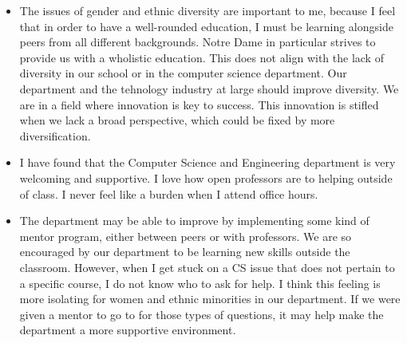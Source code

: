\documentclass[letterpaper]{article}
\begin{document}
\begin{itemize}
\item The issues of gender and ethnic diversity are important to me, because I feel that in order to have a well-rounded education, I must be learning alongside peers from all different backgrounds. Notre Dame in particular strives to provide us with a wholistic education. This does not align with the lack of diversity in our school or in the computer science department. Our department and the tehnology industry at large should improve diversity. We are in a field where innovation is key to success. This innovation is stifled when we lack a broad perspective, which could be fixed by more diversification.
\item I have found that the Computer Science and Engineering department is very welcoming and supportive. I love how open professors are to helping outside of class. I never feel like a burden when I attend office hours.
\item The department may be able to improve by implementing some kind of mentor program, either between peers or with professors. We are so encouraged by our department to be learning new skills outside the classroom. However, when I get stuck on a CS issue that does not pertain to a specific course, I do not know who to ask for help. I think this feeling is more isolating for women and ethnic minorities in our department. If we were given a mentor to go to for those types of questions, it may help make the department a more supportive environment. 
\end{itemize}
\end{document}
